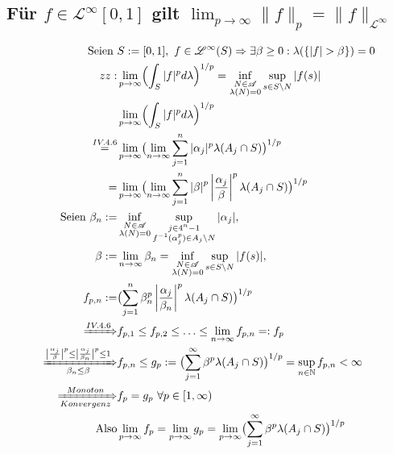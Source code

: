 \documentclass[12pt,a4paper]{article}
\DeclareMathOperator*{\equals}{=}
\begin{document}
\subsection*{Für $f \in \mathscr{L}^{\infty}[0,1]$ gilt $\lim_{p \to\infty}\lVert f \rVert_p = \lVert f \rVert_{\mathscr{L}^{\infty}}$}
\begin{align*}
\text{Seien }& S := [0,1], \ f \in \mathscr{L}^{\infty}(S) \Rightarrow \exists \beta \geq 0: \lambda(\{|f| > \beta \})=0\\
zz: &\lim_{p\to\infty}\Bigl( \int_{S}|f|^p d\lambda \Bigr)^{1/p} = \inf_{\substack{N \in \mathscr{A} \\ \lambda(N)=0}} \sup_{s \in S\setminus N}|f(s)|\\
	&\lim_{p\to\infty}\Bigl( \int_{S}|f|^pd\lambda\Bigr)^{1/p}\\
	\equals^{IV.4.6}&\lim_{p\to\infty}\bigl(\lim_{n\to\infty}\sum_{j=1}^{n}|\alpha_{j}|^{p}\lambda(A_j \cap S)\bigr)^{1/p}\\
	=&\lim_{p\to\infty}\bigl(\lim_{n\to\infty}\sum_{j=1}^{n}\left\lvert\beta\right\lvert^p\left\lvert\frac{\alpha_{j}}{\beta}\right\lvert^{p}\lambda(A_j \cap S)\bigr)^{1/p}\\
\text{Seien } \beta_n := &\inf_{\substack{N \in \mathscr{A} \\ \lambda(N)=0}} \sup_{\substack{j \in 4^n-1\\f^{-1}(\alpha_{j}^p) \in A_j\setminus N}}|\alpha_j|,\\ \beta :=& \lim_{n \to \infty} \beta_n = \inf_{\substack{N \in \mathscr{A} \\ \lambda(N)=0}} \sup_{s \in S\setminus N}|f(s)|, \\
f_{p,n} := &\bigl(\sum_{j=1}^{n}\beta_n^p\left\lvert\frac{\alpha_{j}}{\beta_n}\right\lvert^{p}\lambda(A_j \cap S)\bigr)^{1/p}\\
\xRightarrow{IV.4.6} & f_{p,1} \leq f_{p,2} \leq \ldots \leq \lim_{n\to\infty}f_{p,n} =: f_p\\
\xRightarrow[\beta_n \leq \beta]{\left\lvert\frac{\alpha_{j}}{\beta}\right\lvert^{p}\leq \left\lvert\frac{\alpha_{j}}{\beta_n}\right\lvert^{p} \leq 1} &f_{p,n} \leq g_{p}:=\bigl(\sum_{j=1}^{\infty}\beta^p\lambda(A_j \cap S)\bigr)^{1/p}= \sup_{n \in \mathbb{N}}f_{p,n}< \infty\\
	\xRightarrow[Konvergenz]{Monoton} & f_p = g_p \ \forall p \in [1,\infty)\\
	\text{Also}&\lim_{p\to\infty}f_p = \lim_{p\to\infty}g_p = \lim_{p\to\infty}\bigl(\sum_{j=1}^{\infty}\beta^p\lambda(A_j \cap S)\bigr)^{1/p}\\

\end{align*}
\end{document}
